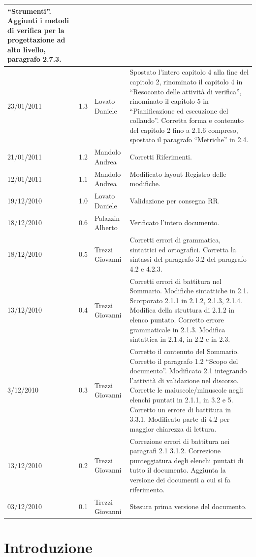 \begin{longtable}{|p{}|c|p{}|p{}|}
``Strumenti''. Aggiunti i metodi di verifica per la progettazione ad alto
livello, paragrafo 2.7.3.\\
\hline
23/01/2011 & 1.3 & Lovato Daniele & Spostato l'intero capitolo 4 alla fine
del capitolo 2, rinominato il capitolo 4 in ``Resoconto delle attivit\`a di
verifica'', rinominato il capitolo 5 in ``Pianificazione ed esecuzione del
collaudo''. Corretta forma e contenuto del capitolo 2 fino a 2.1.6 compreso,
spostato il paragrafo ``Metriche'' in 2.4.  
\\
\hline
21/01/2011 & 1.2 & Mandolo Andrea & Corretti Riferimenti.\\
\hline
12/01/2011 & 1.1 & Mandolo Andrea & Modificato layout Registro delle
modifiche.\\
\hline
19/12/2010 & 1.0 & Lovato Daniele & Validazione per consegna RR.\\
\hline
18/12/2010 & 0.6 & Palazzin Alberto & Verificato l'intero documento.\\
\hline
18/12/2010 & 0.5 & Trezzi Giovanni & Corretti errori di grammatica, sintattici
ed ortografici. Corretta la sintassi del paragrafo 3.2 del paragrafo 4.2 e
4.2.3.\\
\hline
13/12/2010 & 0.4 & Trezzi Giovanni & Corretti errori di battitura nel Sommario.
Modifiche sintattiche in 2.1. Scorporato 2.1.1 in 2.1.2, 2.1.3, 2.1.4. Modifica della
struttura di 2.1.2 in elenco puntato. Corretto errore grammaticale in 2.1.3.
Modifica sintattica in 2.1.4, in 2.2 e in 2.3.\\
\hline
3/12/2010 & 0.3 & Trezzi Giovanni & Corretto il contenuto del Sommario. Corretto
il paragrafo 1.2 ``Scopo del documento''. Modificato 2.1 integrando l'attivit\`a
di validazione nel discorso. Corrette le maiuscole/minuscole negli elenchi
puntati in 2.1.1, in 3.2 e 5. Corretto un errore di battitura in 3.3.1.
Modificato parte di 4.2 per maggior chiarezza di lettura.\\
\hline
13/12/2010 & 0.2 & Trezzi Giovanni & Correzione errori di battitura nei
paragrafi 2.1 3.1.2. Correzione punteggiatura degli elenchi puntati di tutto il documento.
Aggiunta la versione dei documenti a cui si fa riferimento.\\
\hline
03/12/2010 & 0.1 & Trezzi Giovanni & Stesura prima versione del documento.\\
\end{longtable}

\tableofcontents

\chapter{Introduzione}
\thispagestyle{fancy} %

